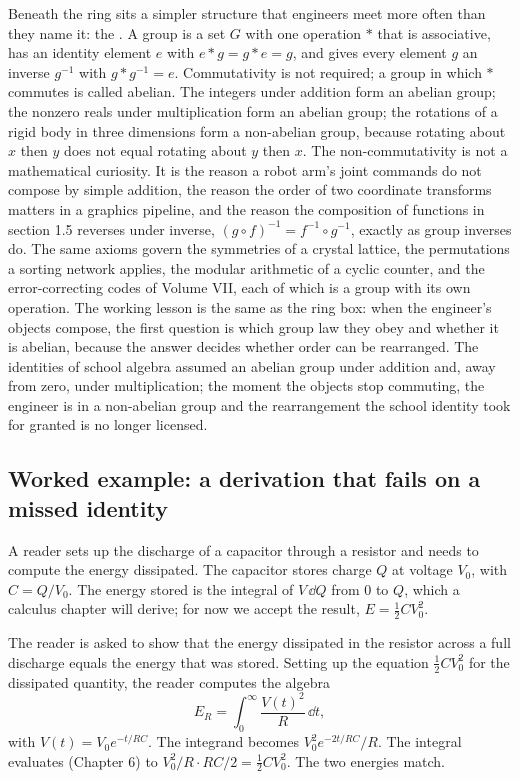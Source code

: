 \begin{mastery}
Beneath the ring sits a simpler structure that engineers meet more
often than they name it: the . A group is a set $G$ with
one operation $\ast$ that is associative, has an identity element $e$
with $e \ast g = g \ast e = g$, and gives every element $g$ an inverse
$g^{-1}$ with $g \ast g^{-1} = e$. Commutativity is not required; a
group in which $\ast$ commutes is called abelian. The integers under
addition form an abelian group; the nonzero reals under multiplication
form an abelian group; the rotations of a rigid body in three
dimensions form a non-abelian group, because rotating about $x$ then
$y$ does not equal rotating about $y$ then $x$. The non-commutativity is
not a mathematical curiosity. It is the reason a robot arm's joint
commands do not compose by simple addition, the reason the order of two
coordinate transforms matters in a graphics pipeline, and the reason
the composition of functions in section 1.5 reverses under inverse,
$(g \circ f)^{-1} = f^{-1} \circ g^{-1}$, exactly as group inverses do.
The same axioms govern the symmetries of a crystal lattice, the
permutations a sorting network applies, the modular arithmetic of a
cyclic counter, and the error-correcting codes of Volume VII, each of
which is a group with its own operation. The working lesson is the same
as the ring box: when the engineer's objects compose, the first
question is which group law they obey and whether it is abelian,
because the answer decides whether order can be rearranged. The
identities of school algebra assumed an abelian group under addition
and, away from zero, under multiplication; the moment the objects stop
commuting, the engineer is in a non-abelian group and the rearrangement
the school identity took for granted is no longer licensed.
\end{mastery}

\subsection{Worked example: a derivation that fails on a missed
identity}

A reader sets up the discharge of a capacitor through a resistor and
needs to compute the energy dissipated. The capacitor stores charge
$Q$ at voltage $V_{0}$, with $C = Q/V_{0}$. The energy stored is the
integral of $V \,\dd Q$ from $0$ to $Q$, which a calculus chapter
will derive; for now we accept the result, $E = \tfrac{1}{2} C
V_{0}^{2}$.

The reader is asked to show that the energy dissipated in the
resistor across a full discharge equals the energy that was stored.
Setting up the equation $\tfrac{1}{2}CV_{0}^{2}$ for the dissipated
quantity, the reader computes the algebra
\[
E_{R} = \int_{0}^{\infty} \frac{V(t)^{2}}{R} \,\dd t,
\]
with $V(t) = V_{0} e^{-t/RC}$. The integrand becomes $V_{0}^{2}
e^{-2t/RC}/R$. The integral evaluates (Chapter 6) to $V_{0}^{2}/R
\cdot RC/2 = \tfrac{1}{2} C V_{0}^{2}$. The two energies match.


